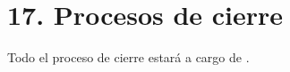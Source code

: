 \documentclass[11pt]{charter}
\begin{document}

\section{17. Procesos de cierre}    
\label{sec:cierre}

Todo el proceso de cierre estará a cargo de \authorname.
\end{document}

